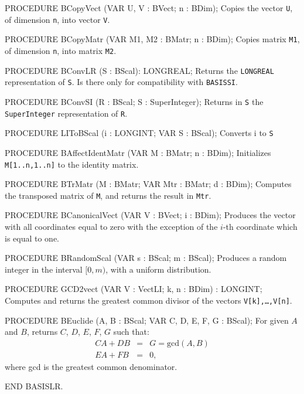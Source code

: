PROCEDURE BCopyVect (VAR U, V : BVect;  n : BDim);
\endcode
  \tab  Copies the vector {\tt U}, of dimension {\tt n}, into vector {\tt V}.
  \endtab
\code

PROCEDURE BCopyMatr (VAR M1, M2 : BMatr;  n : BDim);
\endcode
  \tab  Copies matrix {\tt M1}, of dimension {\tt n}, into matrix {\tt M2}.
  \endtab
\code

PROCEDURE BConvLR (S : BScal): LONGREAL;
\endcode
  \tab  Returns the {\tt LONGREAL} representation of {\tt S}.
  Is there only for compatibility with {\tt BASISSI}. \endtab
\code

PROCEDURE BConvSI (R : BScal;  S : SuperInteger);
\endcode
  \tab  Returns in {\tt S} the {\tt SuperInteger} representation of {\tt R}.
  \endtab
\code

PROCEDURE LIToBScal (i : LONGINT; VAR S : BScal);
\endcode
   \tab Converts i to  {\tt S}\endtab
\code

PROCEDURE BAffectIdentMatr (VAR M : BMatr;  n : BDim);
\endcode
  \tab  Initializes {\tt M[1..n,1..n]} to the identity matrix.\endtab
\code

PROCEDURE BTrMatr (M : BMatr;   VAR Mtr : BMatr;   d : BDim);
\endcode
  \tab  Computes the transposed matrix of {\tt M}, and
        returns the result in {\tt Mtr}.
  \endtab
\code

PROCEDURE BCanonicalVect (VAR V : BVect;  i : BDim);
\endcode
   \tab Produces the vector with all coordinates equal to zero with the
   exception of the $i$-th coordinate which is equal to one.
   \endtab
\code

PROCEDURE BRandomScal (VAR s : BScal; m : BScal);
\endcode
   \tab Produces a random integer in the interval $[0,m)$, with a uniform
   distribution. \endtab
\code

PROCEDURE GCD2vect (VAR V : VectLI;   k, n : BDim) : LONGINT;
\endcode
 \tab  Computes and returns the greatest common divisor of the vectors
  {\tt V[k],\dots,V[n]}.
 \endtab
\code

PROCEDURE BEuclide (A, B : BScal;  VAR C, D, E, F, G : BScal);
\endcode
  \tab For given $A$ and $B$, returns $C$, $D$, $E$, $F$, $G$ such that: 
   \begin {eqnarray*}
     C  A + D  B  &=& G = \mbox{gcd} (A,B) \\
     E  A + F  B  &=& 0,
   \end {eqnarray*}
where {gcd}  is the greatest common denominator.
  \endtab
\code

END BASISLR.
\endcode
